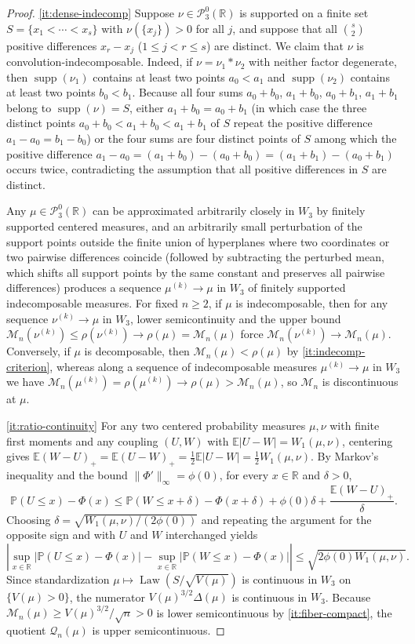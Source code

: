 \documentclass[11pt]{article}
\numberwithin{equation}{section}
\theoremstyle{definition}
\theoremstyle{remark}
\DeclareMathOperator{\supp}{supp}
\DeclareMathOperator{\Law}{Law}
\newcommand{\E}{\mathbb E}
\newcommand{\Pp}{\mathbb P}
\newcommand{\R}{\mathbb R}
\newcommand{\phz}{\phi(0)}
\begin{document}
\begin{proof}
\ref{it:dense-indecomp} Suppose $\nu\in\mathcal P_3^0(\R)$ is supported on a
finite set $S=\{x_1<\cdots<x_s\}$ with $\nu(\{x_j\})>0$ for all $j$, and
suppose that all $\binom{s}{2}$ positive differences $x_r-x_j$ ($1\le j<r\le s$)
are distinct. We claim that $\nu$ is convolution-indecomposable. Indeed, if
$\nu=\nu_1*\nu_2$ with neither factor degenerate, then $\supp(\nu_1)$ contains
at least two points $a_0<a_1$ and $\supp(\nu_2)$ contains at least two points
$b_0<b_1$. Because all four sums $a_0+b_0$, $a_1+b_0$, $a_0+b_1$, $a_1+b_1$
belong to $\supp(\nu)=S$, either $a_1+b_0=a_0+b_1$ (in which case the three
distinct points $a_0+b_0<a_1+b_0<a_1+b_1$ of $S$ repeat the positive
difference $a_1-a_0=b_1-b_0$) or the four sums are four distinct points of $S$
among which the positive difference $a_1-a_0=(a_1+b_0)-(a_0+b_0)=(a_1+b_1)-(a_0+b_1)$
occurs twice, contradicting the assumption that all positive differences in
$S$ are distinct.

Any $\mu\in\mathcal P_3^0(\R)$ can be approximated arbitrarily closely in
$W_3$ by finitely supported centered measures, and an arbitrarily small
perturbation of the support points outside the finite union of hyperplanes
where two coordinates or two pairwise differences coincide (followed by
subtracting the perturbed mean, which shifts all support points by the same
constant and preserves all pairwise differences) produces a sequence
$\mu^{(k)}\to\mu$ in $W_3$ of finitely supported indecomposable measures. For
fixed $n\ge2$, if $\mu$ is indecomposable, then for any sequence $\nu^{(k)}\to\mu$
in $W_3$, lower semicontinuity and the upper bound
$\mathcal M_n(\nu^{(k)})\le\rho(\nu^{(k)})\to\rho(\mu)=\mathcal M_n(\mu)$
force $\mathcal M_n(\nu^{(k)})\to\mathcal M_n(\mu)$. Conversely, if $\mu$ is
decomposable, then $\mathcal M_n(\mu)<\rho(\mu)$ by \ref{it:indecomp-criterion},
whereas along a sequence of indecomposable measures $\mu^{(k)}\to\mu$ in $W_3$
we have $\mathcal M_n(\mu^{(k)})=\rho(\mu^{(k)})\to\rho(\mu)>\mathcal M_n(\mu)$,
so $\mathcal M_n$ is discontinuous at $\mu$.

\ref{it:ratio-continuity} For any two centered probability measures $\mu,\nu$
with finite first moments and any coupling $(U,W)$ with
$\E|U-W|=W_1(\mu,\nu)$, centering gives
$\E(W-U)_+=\E(U-W)_+=\frac12\E|U-W|=\frac12 W_1(\mu,\nu)$. By Markov's
inequality and the bound $\|\Phi'\|_\infty=\phz$, for every $x\in\R$ and
$\delta>0$,
\[
 \Pp(U\le x)-\Phi(x)
 \le \Pp(W\le x+\delta)-\Phi(x+\delta)+\phz\delta+\frac{\E(W-U)_+}{\delta}.
\]
Choosing $\delta=\sqrt{W_1(\mu,\nu)/(2\phz)}$ and repeating the argument for
the opposite sign and with $U$ and $W$ interchanged yields
\[
 \left|\sup_{x\in\R}\bigl|\Pp(U\le x)-\Phi(x)\bigr|
      -\sup_{x\in\R}\bigl|\Pp(W\le x)-\Phi(x)\bigr|\right|
 \le\sqrt{2\phz W_1(\mu,\nu)}.
\]
Since standardization $\mu\mapsto\Law(S/\sqrt{V(\mu)})$ is continuous in $W_3$
on $\{V(\mu)>0\}$, the numerator $V(\mu)^{3/2}\Delta(\mu)$ is continuous in
$W_3$. Because $\mathcal M_n(\mu)\ge V(\mu)^{3/2}/\sqrt n>0$ is lower
semicontinuous by \ref{it:fiber-compact}, the quotient $\mathcal Q_n(\mu)$ is
upper semicontinuous.


\end{proof}
\end{document}

